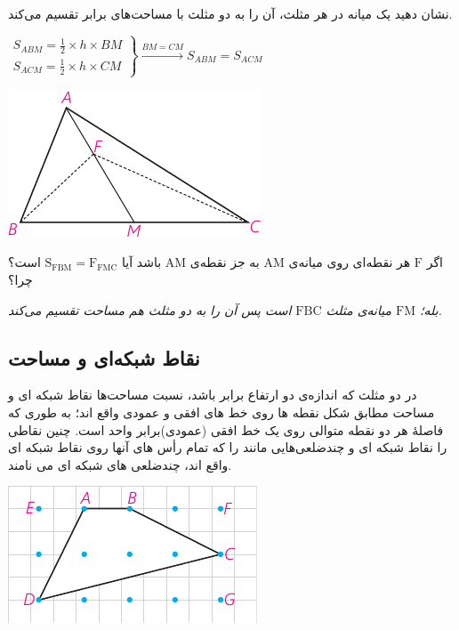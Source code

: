 \documentclass[12pt, a4paper]{book}
\begin{document}
 \begin{minipage}{0.65\textwidth}
 	نشان دهید یک میانه در هر مثلث، آن را به دو مثلث با مساحت‌های برابر تقسیم می‌کند.
 	\begin{flushleft}
 		$\left.
 		\begin{array}{ccc}
 			S_{ABM} = \frac12 \times h \times BM \\
 			S_{ACM} = \frac12 \times h \times CM
 		\end{array}
 		\right\}
 		\xrightarrow{BM = CM} S_{ABM} = S_{ACM}
 		$
 	\end{flushleft}
 \end{minipage}
 \begin{minipage}{0.3\textwidth}
 	\begin{flushleft}
 		\includegraphics{"Shapes/Fasl - 3/Dars 2/P66-S1"}
 	\end{flushleft}
 \end{minipage}

اگر $\mathrm{F}$ هر نقطه‌ای روی میانه‌ی $\mathrm{AM}$ به جز نقطه‌ی $\mathrm{AM}$ باشد آیا $\mathrm{S_{FBM} = F_{FMC}}$ است؟ چرا؟

\textit{بله؛ 
	$\mathrm{FM}$
	میانه‌ی مثلث 
	$\mathrm{FBC}$
	است پس آن را به دو مثلث هم مساحت تقسیم می‌کند.}


\newpage


\subsection{نقاط شبکه‌ای و مساحت}

	  \begin{minipage}{0.7\textwidth}
در دو مثلث که اندازه‌ی دو ارتفاع برابر باشد، نسبت مساحت‌ها نقاط شبکه ای و مساحت مطابق شکل نقطه ها روی خط های افقی و عمودی واقع اند؛ به طوری که فاصلهٔ هر دو نقطه متوالی روی یک خط افقی (عمودی)برابر واحد است. چنین نقاطی را نقاط شبکه ای و چندضلعی‌هایی مانند
را که تمام رأس های آنها روی نقاط شبکه ای واقع اند، چندضلعی های شبکه ای می نامند.
\end{minipage}   
\begin{minipage}{.3\textwidth}
	\begin{flushleft}
		\includegraphics{"Shapes/Fasl - 3/Dars 2/P69-S1.pdf"}
	\end{flushleft}
\end{minipage}
\end{document}
